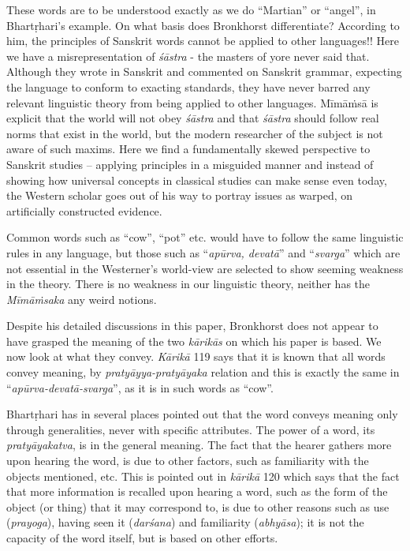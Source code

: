 These words are to be understood exactly as we do “Martian” or “angel”, in Bhartṛhari’s example. On what basis does Bronkhorst differentiate? According to him, the principles of Sanskrit words cannot be applied to other languages!! Here we have a misrepresentation of \textit{śāstra} - the masters of yore never said that. Although they wrote in Sanskrit and commented on Sanskrit grammar, expecting the language to conform to exacting standards, they have never barred any relevant linguistic theory from being applied to other languages. Mīmāṁsā is explicit that the world will not obey \textit{śāstra} and that \textit{śāstra} should follow real norms that exist in the world, but the modern researcher of the subject is not aware of such maxims. Here we find a fundamentally skewed perspective to Sanskrit studies – applying principles in a misguided manner and instead of showing how universal concepts in classical studies can make sense even today, the Western scholar goes out of his way to portray issues as warped, on artificially constructed evidence.

Common words such as “cow”, “pot” etc. would have to follow the same linguistic rules in any language, but those such as “\textit{apūrva, devatā}” and “\textit{svarga}” which are not essential in the Westerner’s world-view are selected to show seeming weakness in the theory. There is no weakness in our linguistic theory, neither has the \textit{Mīmāṁsaka} any weird notions.

Despite his detailed discussions in this paper, Bronkhorst does not appear to have grasped the meaning of the two \textit{kārikās} on which his paper is based. We now look at what they convey. \textit{Kārikā} 119 says that it is known that all words convey meaning, by \textit{pratyāyya-pratyāyaka} relation and this is exactly the same in “\textit{apūrva-devatā-svarga}”, as it is in such words as “cow”.

Bhartṛhari has in several places pointed out that the word conveys meaning only through generalities, never with specific attributes. The power of a word, its \textit{pratyāyakatva}, is in the general meaning. The fact that the hearer gathers more upon hearing the word, is due to other factors, such as familiarity with the objects mentioned, etc. This is pointed out in \textit{kārikā} 120 which says that the fact that more information is recalled upon hearing a word, such as the form of the object (or thing) that it may correspond to, is due to other reasons such as use (\textit{prayoga}), having seen it (\textit{darśana}) and familiarity (\textit{abhyāsa}); it is not the capacity of the word itself, but is based on other efforts.

